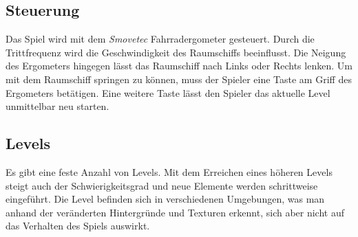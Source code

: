 \subsection{Steuerung}
Das Spiel wird mit dem \textit{Smovetec} Fahrradergometer gesteuert. Durch die Trittfrequenz wird die Geschwindigkeit des Raumschiffs beeinflusst. Die Neigung des Ergometers hingegen lässt das Raumschiff nach Links oder Rechts lenken. Um mit dem Raumschiff springen zu können, muss der Spieler eine Taste am Griff des Ergometers betätigen. Eine weitere Taste lässt den Spieler das aktuelle Level unmittelbar neu starten.

\subsection{Levels}
Es gibt eine feste Anzahl von Levels. Mit dem Erreichen eines höheren Levels steigt auch der Schwierigkeitsgrad und neue Elemente werden schrittweise eingeführt. Die Level befinden sich in verschiedenen Umgebungen, was man anhand der veränderten Hintergründe und Texturen erkennt, sich aber nicht auf das Verhalten des Spiels auswirkt.